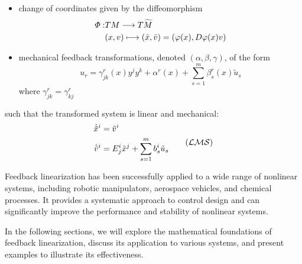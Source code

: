 \begin{itemize}
    \item change of coordinates given by the diffeomorphism
    \begin{equation}
        \begin{split}
            \varPhi: & TM \longrightarrow T\widetilde{M} \\
            & (x,v) \longmapsto (\tilde{x}, \tilde{v}) = (\varphi(x), D \varphi(x)v)
        \end{split}
    \end{equation}
    \item mechanical feedback transformations, denoted $(\alpha, \beta, \gamma)$, of the form
    \begin{equation}
        u_r = \gamma^r_{jk}(x) y^j y^k + \alpha^r (x) + \sum_{s=1}^m \beta^r_s(x) \tilde{u}_s
    \end{equation}
    where $\gamma^r_{jk} = \gamma^r_{kj}$
\end{itemize}
such that the transformed system is linear and mechanical:
\begin{equation}
    \begin{split}
        \dot{\tilde{x}}^i & = \tilde{v}^i \\
        \dot{\tilde{v}}^i & = E^i_j \tilde{x}^j + \sum_{s=1}^m b_s^i \tilde{u}_s
    \end{split} \tag{$\mathcal{LMS}$}
\end{equation}

Feedback linearization has been successfully applied to a wide range of nonlinear systems, including robotic manipulators, aerospace vehicles, and chemical processes. It provides a systematic approach to control design and can significantly improve the performance and stability of nonlinear systems.

In the following sections, we will explore the mathematical foundations of feedback linearization, discuss its application to various systems, and present examples to illustrate its effectiveness.